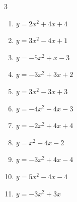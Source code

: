 \begin{multicols}{3}
\begin{enumerate}
  \item $\displaystyle y=2x^{2}+4x+4$

        \phantom{$\displaystyle 頂点\left( -1 , 2 \right)$}

  \item $\displaystyle y=3x^{2}-4x+1$


  \item $\displaystyle y=-5x^{2}+x-3$


  \item $\displaystyle y=-3x^{2}+3x+2$


\columnbreak %

  \item $\displaystyle y=3x^{2}-3x+3$


  \item $\displaystyle y=-4x^{2}-4x-3$


  \item $\displaystyle y=-2x^{2}+4x+4$

        \phantom{$\displaystyle 頂点\left( 1 , 6 \right)$}

  \item $\displaystyle y=x^{2}-4x-2$

        \phantom{$\displaystyle 頂点\left( 2 , -6 \right)$}

  \item $\displaystyle y=-3x^{2}+4x-4$


\columnbreak %

\resetques

  \item $\displaystyle y=5x^{2}-4x-4$


  \item $\displaystyle y=-3x^{2}+3x$


\end{enumerate}
\end{multicols}
